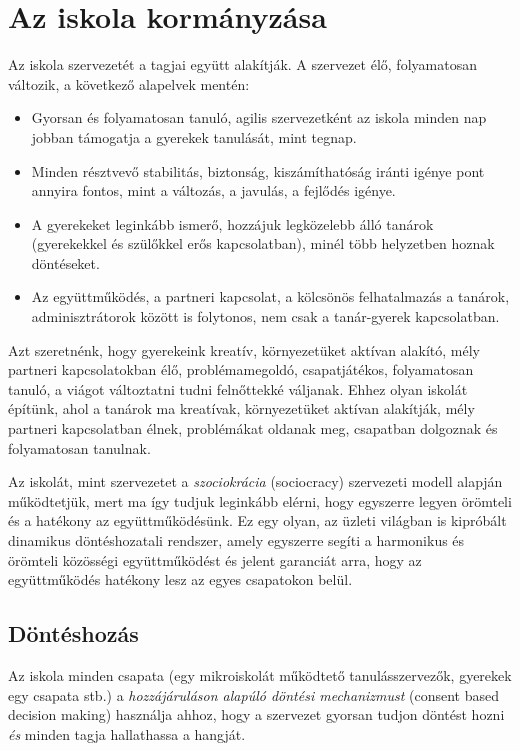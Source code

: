 \section{Az iskola kormányzása}

Az iskola szervezetét a tagjai együtt alakítják. A szervezet élő,
folyamatosan változik, a következő alapelvek mentén:

\begin{itemize}

\item
  Gyorsan és folyamatosan tanuló, agilis szervezetként az iskola minden
  nap jobban támogatja a gyerekek tanulását, mint tegnap.
\item
  Minden résztvevő stabilitás, biztonság, kiszámíthatóság iránti igénye
  pont annyira fontos, mint a változás, a javulás, a fejlődés igénye.
\item
  A gyerekeket leginkább ismerő, hozzájuk legközelebb álló tanárok
  (gyerekekkel és szülőkkel erős kapcsolatban), minél több helyzetben
  hoznak döntéseket.
\item
  Az együttműködés, a partneri kapcsolat, a kölcsönös felhatalmazás a
  tanárok, adminisztrátorok között is folytonos, nem csak a tanár-gyerek
  kapcsolatban.
\end{itemize}

Azt szeretnénk, hogy gyerekeink kreatív, környezetüket aktívan alakító,
mély partneri kapcsolatokban élő, problémamegoldó, csapatjátékos,
folyamatosan tanuló, a viágot változtatni tudni felnőttekké váljanak.
Ehhez olyan iskolát építünk, ahol a tanárok ma kreatívak, környezetüket
aktívan alakítják, mély partneri kapcsolatban élnek, problémákat oldanak
meg, csapatban dolgoznak és folyamatosan tanulnak.

Az iskolát, mint szervezetet a \emph{szociokrácia} (sociocracy)
szervezeti modell alapján működtetjük, mert ma így tudjuk leginkább
elérni, hogy egyszerre legyen örömteli és a hatékony az
együttműködésünk. Ez egy olyan, az üzleti világban is kipróbált
dinamikus döntéshozatali rendszer, amely egyszerre segíti a harmonikus
és örömteli közösségi együttműködést és jelent garanciát arra, hogy az
együttműködés hatékony lesz az egyes csapatokon belül.


\subsection{Döntéshozás}

Az iskola minden csapata (egy mikroiskolát működtető tanulásszervezők,
gyerekek egy csapata stb.) a \emph{hozzájáruláson alapúló döntési
mechanizmust} (consent based decision making) használja ahhoz, hogy a
szervezet gyorsan tudjon döntést hozni \emph{és} minden tagja
hallathassa a hangját.

